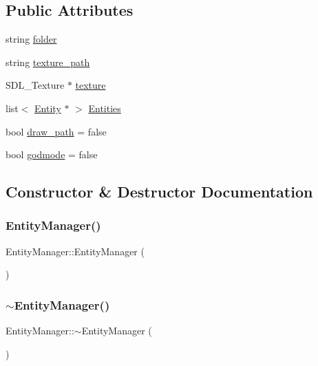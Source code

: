 \subsection*{Public Attributes}
\begin{DoxyCompactItemize}
\item 
string \mbox{\hyperlink{class_entity_manager_aca6f046da49e1c17f9ba3061f6180752}{folder}}
\item 
string \mbox{\hyperlink{class_entity_manager_a2dbc8776addfb76925b05afc712b34f7}{texture\+\_\+path}}
\item 
S\+D\+L\+\_\+\+Texture $\ast$ \mbox{\hyperlink{class_entity_manager_a87bae2d70d4acbf8aa4e22c412a01f65}{texture}}
\item 
list$<$ \mbox{\hyperlink{class_entity}{Entity}} $\ast$ $>$ \mbox{\hyperlink{class_entity_manager_afddbd7d396bbcf51f63c05102da4dbf9}{Entities}}
\item 
bool \mbox{\hyperlink{class_entity_manager_a388b254709bddf12a82709b671a43d28}{draw\+\_\+path}} = false
\item 
bool \mbox{\hyperlink{class_entity_manager_ada03c701dcfe1a2751be416cdd42b556}{godmode}} = false
\end{DoxyCompactItemize}


\subsection{Constructor \& Destructor Documentation}
\mbox{\label{class_entity_manager_a7555637657d090171be6ceee8451de0a}} 
\subsubsection{\texorpdfstring{EntityManager()}{EntityManager()}}
{\footnotesize\ttfamily Entity\+Manager\+::\+Entity\+Manager (\begin{DoxyParamCaption}{ }\end{DoxyParamCaption})}

\mbox{\label{class_entity_manager_a71a36c9fb8d579a1a1ec108e0fccf175}} 
\subsubsection{\texorpdfstring{$\sim$EntityManager()}{~EntityManager()}}
{\footnotesize\ttfamily Entity\+Manager\+::$\sim$\+Entity\+Manager (\begin{DoxyParamCaption}{ }\end{DoxyParamCaption})}



